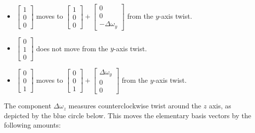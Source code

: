 \documentclass{article}
\begin{document}
\begin{itemize}
\item \(\begin{bmatrix} 1 \\ 0 \\ 0 \end{bmatrix}\) moves to \(\begin{bmatrix} 1 \\ 0 \\ 0 \end{bmatrix} + \begin{bmatrix} 0 \\ 0 \\ -\Delta\omega_y \end{bmatrix}\) from the \(y\)-axis twist.
\item \(\begin{bmatrix} 0 \\ 1 \\ 0 \end{bmatrix}\) does not move from the \(y\)-axis twist.
\item \(\begin{bmatrix} 0 \\ 0 \\ 1 \end{bmatrix}\) moves to \(\begin{bmatrix} 0 \\ 0 \\ 1 \end{bmatrix} + \begin{bmatrix} \Delta\omega_y \\ 0 \\ 0 \end{bmatrix}\) from the \(y\)-axis twist.
\end{itemize}   
The component \(\Delta\omega_z\) measures counterclockwise twist around the \(z\) axis, as depicted by the blue circle below. This moves the elementary basis vectors by the following amounts:
\end{document}
